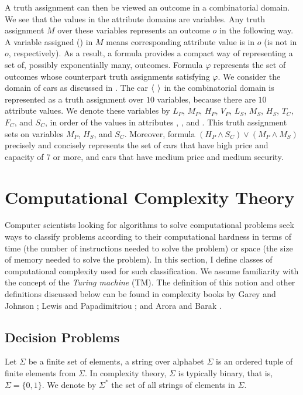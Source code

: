 A truth assignment can then be viewed an outcome in a combinatorial domain.
We see that the values in the attribute domains are variables.
Any truth assignment $M$ over these variables represents an outcome $o$
in the following way.
A variable assigned  () in $M$ means corresponding 
attribute value is in $o$ (is not in $o$, respectively).
As a result, a formula provides a compact way of representing a set of, 
possibly exponentially many, outcomes.
Formula $\varphi$ represents the set of outcomes whose counterpart
truth assignments satisfying $\varphi$.
We consider the domain of cars as discussed in .
The car $\mathit{\langle}$  $\mathit{\rangle}$ in the combinatorial domain
is represented as a truth assignment over $10$ variables, because
there are $10$ attribute values.
We denote these variables by $L_P$, $M_P$, $H_P$, $V_P$,
$L_S$, $M_S$, $H_S$, $T_C$, $F_C$, and $S_C$, in order of the
values in attributes , , and .
This truth assignment sets  on variables $M_P$,
$H_S$, and $S_C$.
Moreover, formula $(H_P \land S_C) \lor (M_P \land M_S)$ precisely
and concisely represents the set of cars that have high price and
capacity of 7 or more, and cars that have medium price and medium
security.


\section{Computational Complexity Theory \label{sec:comp_theory}}

Computer scientists looking for algorithms to solve computational problems
seek ways to classify problems according to their computational hardness
in terms of time (the number of instructions needed to solve the problem) 
or space (the size of memory needed to solve the problem).
In this section, I define classes of computational
complexity used for such classification.
We assume familiarity with the concept of the \textit{Turing machine} (TM).
The definition of this notion and other definitions discussed 
below can be found in complexity
books by Garey and Johnson \cite{gar-joh:b:int}; Lewis and Papadimitriou
\cite{Lewis:Comput}; and Arora and Barak \cite{Arora:Comput}.



\subsection{Decision Problems}
Let $\Sigma$ be a finite set of elements, a string over alphabet $\Sigma$
is an ordered tuple of finite elements from $\Sigma$. In complexity theory,
$\Sigma$ is typically binary, that is, $\Sigma=\{0,1\}$.
We denote by $\Sigma^*$ the set of all strings of elements in $\Sigma$.


